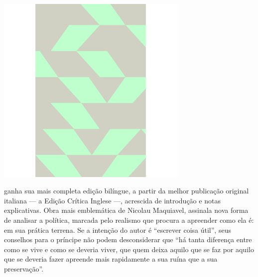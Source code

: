 \hspace*{-.4cm}\begin{minipage}[c]{.5\linewidth}
\small{
{}}
\end{minipage}


\pagebreak

\begin{center}
\hspace*{.5cm}\includegraphics[width=92mm]{./grid/maquiavel.jpg}
\end{center}

\hspace*{-7cm}\hrulefill\hspace*{-7cm}

\medskip

 ganha sua mais completa edição bilíngue, a partir da melhor publicação original italiana --- a Edição Crítica Inglese ---, acrescida de introdução e notas explicativas. Obra mais emblemática de Nicolau Maquiavel, {} assinala nova forma de analisar a política, marcada pelo realismo que procura a apreender como ela é: em sua prática terrena. Se a intenção do autor é “escrever coisa útil”, seus conselhos para o príncipe não podem desconsiderar que “há tanta diferença entre como se vive e como se deveria viver, que quem deixa aquilo que se faz por aquilo que se deveria fazer apreende mais rapidamente a sua ruína que a sua preservação”.


